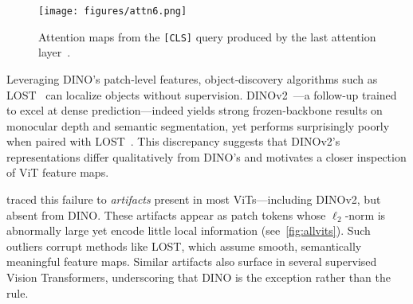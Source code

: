 \documentclass{article}
\newcommand{\citet}{\textcite}
\newcommand{\citep}{\parencite}
\begin{document}
\begin{figure}[t]
    \centering
    \texttt{[image: figures/attn6.png]}
    \caption{Attention maps from the \texttt{[CLS]} query produced by the last attention layer~\citep{caronEmergingPropertiesSelfsupervised2021}.}
    \label{fig:attn6}
\end{figure}

Leveraging DINO’s patch‑level features, object‑discovery algorithms such as LOST~\citep{simeoniLocalizingObjectsSelfsupervised2021} can localize objects without supervision.
DINOv2~\citep{oquabDINOv2LearningRobust2024}—a follow‑up trained to excel at dense prediction—indeed yields strong frozen‑backbone results on monocular depth and semantic segmentation, yet performs surprisingly poorly when paired with LOST~\citep{darcetVisionTransformersNeed2024}.
This discrepancy suggests that DINOv2’s representations differ qualitatively from DINO’s and motivates a closer inspection of ViT feature maps.

\citet{darcetVisionTransformersNeed2024} traced this failure to \emph{artifacts} present in most ViTs—including DINOv2, but absent from DINO. 
These artifacts appear as patch tokens whose $\ell_2$‑norm is abnormally large yet encode little local information (see~\cref{fig:allvits}). 
Such outliers corrupt methods like LOST, which assume smooth, semantically meaningful feature maps. 
Similar artifacts also surface in several supervised Vision Transformers, underscoring that DINO is the exception rather than the rule.
\end{document}
